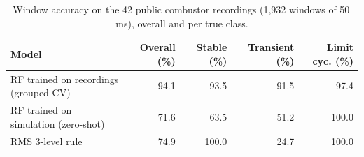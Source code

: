 \begin{table}[H]\centering\small
\caption{Window accuracy on the 42 public combustor recordings (1{,}932 windows of 50\,ms), overall and per true class.}\label{tab:real}
\begin{tabular}{lrrrr}\toprule
Model & Overall (\%) & Stable (\%) & Transient (\%) & Limit cyc. (\%) \\\midrule
RF trained on recordings (grouped CV) & 94.1 & 93.5 & 91.5 & 97.4 \\
RF trained on simulation (zero-shot) & 71.6 & 63.5 & 51.2 & 100.0 \\
RMS 3-level rule & 74.9 & 100.0 & 24.7 & 100.0 \\
\bottomrule\end{tabular}
\end{table}
